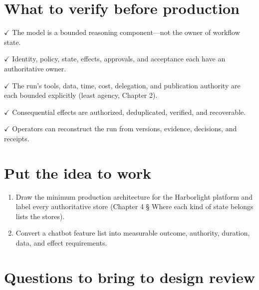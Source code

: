 \section{What to verify before production}

\textbf{\ensuremath{\checkmark}} The model is a bounded reasoning component—not the owner of workflow state.\par

\textbf{\ensuremath{\checkmark}} Identity, policy, state, effects, approvals, and acceptance each have an authoritative owner.\par

\textbf{\ensuremath{\checkmark}} The run's tools, data, time, cost, delegation, and publication authority are each bounded explicitly (least agency, Chapter 2).\par

\textbf{\ensuremath{\checkmark}} Consequential effects are authorized, deduplicated, verified, and recoverable.\par

\textbf{\ensuremath{\checkmark}} Operators can reconstruct the run from versions, evidence, decisions, and receipts.\par

\section{Put the idea to work}

\begin{enumerate}

\item Draw the minimum production architecture for the Harborlight platform and label every authoritative store (Chapter 4 § Where each kind of state belongs lists the stores).

\item Convert a chatbot feature list into measurable outcome, authority, duration, data, and effect requirements.

\end{enumerate}

\section{Questions to bring to design review}

